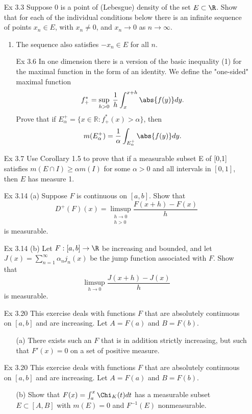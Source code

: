 \documentclass[letterpaper]{article}
\begin{document}
\begin{enumerate}
	\pagebreak
	\item[Ex 3.3] Suppose $0$ is a point of (Lebesgue) density of the set $E \subset \R$.  Show that for each of the individual conditions below there is an infinite sequence of points $x_n \in E$, with $x_n \neq 0$, and $x_n \rightarrow 0$ as $n \rightarrow \infty$.
	\begin{enumerate}
		\item The sequence also satisfies $-x_n \in E$ for all $n.$
	\pagebreak
	\item[Ex 3.6] In one dimension there is a version of the basic inequality (1) for the maximal function in the form of an identity. We define the "one-sided" maximal function $$f_+^*= \sup_{h>0}\; \frac{1}{h} \int_x^{x+h}\abs{f(y)}dy.$$ Prove that if $E_{\alpha}^+=\{x \in \mathbb{R}: f_+^*(x) > \alpha\}$, then $$m(E_\alpha^+)=\frac{1}{\alpha}\int_{E_\alpha^+}\abs{f(y)}dy.$$
	\end{enumerate}
	
	\pagebreak
	\item[Ex 3.7] Use Corollary 1.5 to prove that if a measurable subset E of [0,1] satisfies $m(E\cap I)\geq \alpha m(I)$ for some $\alpha >0$ and all intervals in $[0,1]$, then $E$ has measure 1. 
	
	\pagebreak
	\item[Ex 3.14 (a)] Suppose $F$ is continuous on $[a,b].$ Show that 
        $$D^+(F)(x) = \limsup_{\substack{h\to0 \\ h>0}} \frac{F(x+h) - F(x)}{h}$$
        is measurable.

	\pagebreak
	\item[Ex 3.14 (b)] Let $F:[a, b]\to\R$ be increasing and bounded, and let $J(x)=\sum_{n=1}^\infty\alpha_nj_n(x)$ be the jump function associated with $F$. Show that 
        $$\limsup_{h\to 0}\frac{J(x+h)-J(x)}{h}$$
        is measurable. 
        
  \pagebreak
	\item[Ex 3.20] This exercise deals with functions $F$ that are absolutely continuous on $[a,b]$ and are increasing.  Let $A = F(a)$ and $B=F(b)$.
	\begin{enumerate}[label=(\alph*)]
		\item[(a)] There exists such an $F$ that is in addition strictly increasing, but such that $F'(x) = 0$ on a set of positive measure.
	\end{enumerate}
	
	\pagebreak
	\item[Ex 3.20] This exercise deals with functions $F$ that are absolutely continuous on $[a,b]$ and are increasing.  Let $A = F(a)$ and $B=F(b)$.
	\begin{enumerate}[label=(\alph*)]
		\item[(b)] Show that $F(x) =  \int^x_a \Chi _K(t)dt$ has a measurable subset $E \subset [A,B]$ with $m(E)=0$ and $F^{-1}(E)$ nonmeasurable. 
	\end{enumerate}
	

\end{enumerate}
\end{document}
